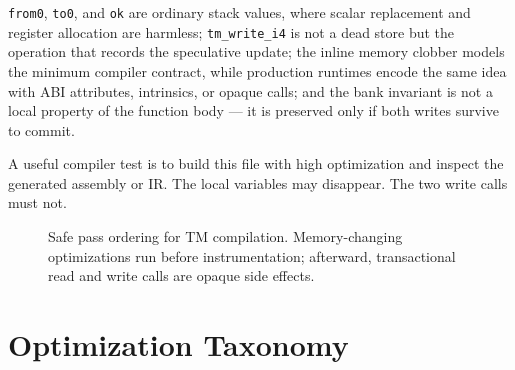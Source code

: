 \texttt{from0}, \texttt{to0}, and \texttt{ok} are ordinary stack values, where scalar replacement and register allocation are harmless; \texttt{tm\_write\_i4} is not a dead store but the operation that records the speculative update; the inline memory clobber models the minimum compiler contract, while production runtimes encode the same idea with ABI attributes, intrinsics, or opaque calls; and the bank invariant is not a local property of the function body --- it is preserved only if both writes survive to commit.

A useful compiler test is to build this file with high optimization and inspect the generated assembly or IR. The local variables may disappear. The two write calls must not.

\begin{figure}[htbp]
\centering
{}
\caption{Safe pass ordering for TM compilation. Memory-changing optimizations run before instrumentation; afterward, transactional read and write calls are opaque side effects.}
\label{fig:tm-pass-ordering}
\end{figure}

\section{Optimization Taxonomy}
\label{sec:optimization-taxonomy}

